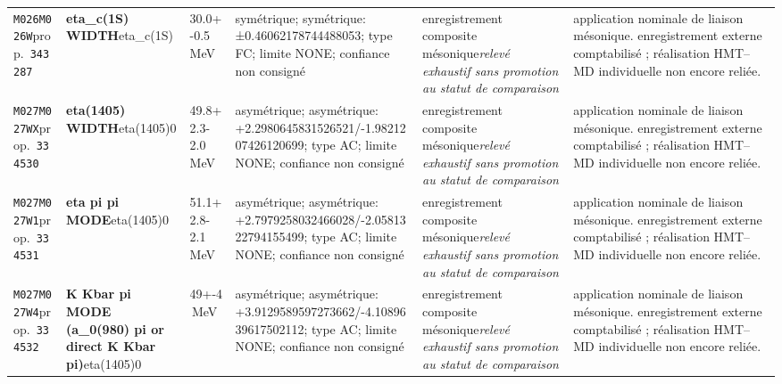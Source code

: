 \begin{landscape}
\begin{longtable}{L{1.85cm}L{4.45cm}L{2.35cm}L{4.05cm}L{3.35cm}L{7.15cm}}
\texttt{M026}\newline \texttt{M026W}\newline prop.\ \texttt{343287} & \textbf{eta\_\allowbreak{}c(1S) WIDTH}\newline eta\_\allowbreak{}c(1S) & 30.0+-0.5\,MeV & symétrique; symétrique: ±0.46062178744488053; type FC; limite NONE; confiance non consigné & enregistrement composite mésonique\newline \emph{relevé exhaustif sans promotion au statut de comparaison} & application nominale de liaison mésonique. enregistrement externe comptabilisé ; réalisation HMT--MD individuelle non encore reliée. \\
\texttt{M027}\newline \texttt{M027WX}\newline prop.\ \texttt{334530} & \textbf{eta(1405) WIDTH}\newline eta(1405)0 & 49.8+2.3-2.0\,MeV & asymétrique; asymétrique: +2.2980645831526521/-1.9821207426120699; type AC; limite NONE; confiance non consigné & enregistrement composite mésonique\newline \emph{relevé exhaustif sans promotion au statut de comparaison} & application nominale de liaison mésonique. enregistrement externe comptabilisé ; réalisation HMT--MD individuelle non encore reliée. \\
\texttt{M027}\newline \texttt{M027W1}\newline prop.\ \texttt{334531} & \textbf{eta pi pi MODE}\newline eta(1405)0 & 51.1+2.8-2.1\,MeV & asymétrique; asymétrique: +2.7979258032466028/-2.0581322794155499; type AC; limite NONE; confiance non consigné & enregistrement composite mésonique\newline \emph{relevé exhaustif sans promotion au statut de comparaison} & application nominale de liaison mésonique. enregistrement externe comptabilisé ; réalisation HMT--MD individuelle non encore reliée. \\
\texttt{M027}\newline \texttt{M027W4}\newline prop.\ \texttt{334532} & \textbf{K Kbar pi MODE (a\_\allowbreak{}0(980) pi or direct K Kbar pi)}\newline eta(1405)0 & 49+-4\,MeV & asymétrique; asymétrique: +3.9129589597273662/-4.1089639617502112; type AC; limite NONE; confiance non consigné & enregistrement composite mésonique\newline \emph{relevé exhaustif sans promotion au statut de comparaison} & application nominale de liaison mésonique. enregistrement externe comptabilisé ; réalisation HMT--MD individuelle non encore reliée. \\

\end{longtable}
\end{landscape}
